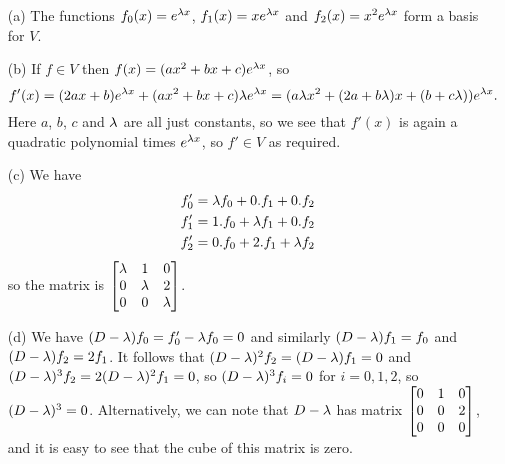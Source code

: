  \begin{itemize}
  \item[(a)] The functions $f_0(x)=e^{\lambda x}$, $f_1(x)=xe^{\lambda x}$
  and $f_2(x)=x^2e^{\lambda x}$ form a basis for $V$.
  \item[(b)] If $f\in V$ then $f(x)=(ax^2+bx+c)e^{\lambda x}$, so
   \[ f'(x)=(2ax+b)e^{\lambda x} + (ax^2+bx+c)\lambda e^{\lambda x}
       = (a\lambda x^2+(2a+b\lambda)x + (b+c\lambda))e^{\lambda x}.
   \]
   Here $a$, $b$, $c$ and $\lambda$ are all just constants, so we see
   that $f'(x)$ is again a quadratic polynomial times $e^{\lambda x}$,
   so $f'\in V$ as required.
  \item[(c)]
   We have
   \begin{align*}
    f'_0 &= \lambda f_0 + 0. f_1 + 0.f_2 \\
    f'_1 &= 1.f_0 + \lambda f_1 + 0.f_2 \\
    f'_2 &= 0.f_0 + 2.f_1 + \lambda f_2
   \end{align*}
   so the matrix is $\left[\begin{matrix} \lambda&1&0 \\ 0&\lambda&2 \\ 0&0&\lambda\end{matrix}\right]$.
  \item[(d)] We have $(D-\lambda)f_0=f'_0-\lambda f_0=0$ and similarly
   $(D-\lambda)f_1=f_0$ and $(D-\lambda)f_2=2f_1$.  It follows that
   $(D-\lambda)^2f_2=(D-\lambda)f_1=0$ and $(D-\lambda)^3f_2=2(D-\lambda)^2f_1=0$,
   so $(D-\lambda)^3f_i=0$ for $i=0,1,2$, so $(D-\lambda)^3=0$.
   Alternatively, we can note that $D-\lambda$ has matrix
   $\left[\begin{matrix} 0&1&0\\ 0&0&2\\ 0&0&0\end{matrix}\right]$, and it is easy to see that
   the cube of this matrix is zero.
 \end{itemize}
\EndDeferredSolution

